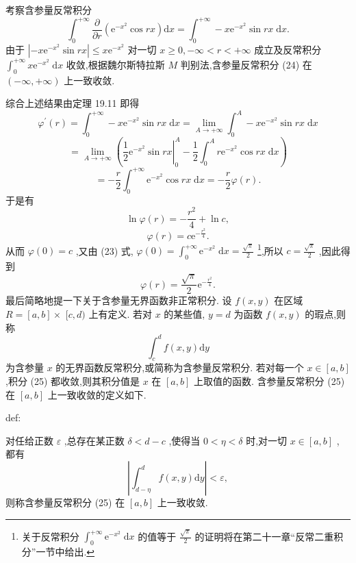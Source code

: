 考察含参量反常积分
\[
{\int }_{0}^{+\infty }\frac{\partial }{\partial r}\left( {{\mathrm{e}}^{-{x}^{2}}\cos {rx}}\right) \mathrm{d}x = {\int }_{0}^{+\infty } - x{\mathrm{e}}^{-{x}^{2}}\sin {rx}\mathrm{\;d}x. \tag{24}
\]
由于 \(\left| {-x{\mathrm{e}}^{-{x}^{2}}\sin {rx}}\right|  \leq  x{\mathrm{e}}^{-{x}^{2}}\) 对一切 \(x \geq  0, - \infty  < r <  + \infty\) 成立及反常积分 \({\int }_{0}^{+\infty }x{\mathrm{e}}^{-{x}^{2}}\mathrm{\;d}x\) 收敛,根据魏尔斯特拉斯 \(M\) 判别法,含参量反常积分 (24) 在 \(\left( {-\infty , + \infty }\right)\) 上一致收敛.

综合上述结果由定理 19.11 即得
\[
{\varphi }^{\prime }\left( r\right)  = {\int }_{0}^{+\infty } - x{\mathrm{e}}^{-{x}^{2}}\sin {rx}\mathrm{\;d}x = \mathop{\lim }\limits_{{A \rightarrow   + \infty }}{\int }_{0}^{A} - x{\mathrm{e}}^{-{x}^{2}}\sin {rx}\mathrm{\;d}x
\]
\[
= \mathop{\lim }\limits_{{A \rightarrow   + \infty }}\left( {{\left. \frac{1}{2}{\mathrm{e}}^{-{x}^{2}}\sin rx\right| }_{0}^{A} - \frac{1}{2}{\int }_{0}^{A}r{\mathrm{e}}^{-{x}^{2}}\cos {rx}\mathrm{\;d}x}\right)
\]
\[
=  - \frac{r}{2}{\int }_{0}^{+\infty }{\mathrm{e}}^{-{x}^{2}}\cos {rx}\mathrm{\;d}x =  - \frac{r}{2}\varphi \left( r\right) .
\]
于是有
\[
\ln \varphi \left( r\right)  =  - \frac{{r}^{2}}{4} + \ln c,
\]
\[
\varphi \left( r\right)  = c{\mathrm{e}}^{-\frac{{r}^{2}}{4}}.
\]
从而 \(\varphi \left( 0\right)  = c\) ,又由 (23) 式, \(\varphi \left( 0\right)  = {\int }_{0}^{+\infty }{\mathrm{e}}^{-{x}^{2}}\mathrm{\;d}x = \frac{\sqrt{\pi }}{2}\) \footnote{关于反常积分 \({\int }_{0}^{+\infty }{\mathrm{e}}^{-{x}^{2}}\mathrm{\;d}x\) 的值等于 \(\frac{\sqrt{\pi }}{2}\) 的证明将在第二十一章“反常二重积分”一节中给出.},所以 \(c = \frac{\sqrt{\pi }}{2}\) ,因此得到
\[
\varphi \left( r\right)  = \frac{\sqrt{\pi }}{2}{\mathrm{e}}^{-\frac{{r}^{2}}{4}}.
\]
最后简略地提一下关于含参量无界函数非正常积分. 设 \(f\left( {x,y}\right)\) 在区域 \(R = \left\lbrack  {a,b}\right\rbrack   \times\)  \(\lbrack c,d)\) 上有定义. 若对 \(x\) 的某些值, \(y = d\) 为函数 \(f\left( {x,y}\right)\) 的瑕点,则称
\[
{\int }_{c}^{d}f\left( {x,y}\right) \mathrm{d}y \tag{25}
\]
为含参量 \(x\) 的无界函数反常积分,或简称为含参量反常积分. 若对每一个 \(x \in  \left\lbrack  {a,b}\right\rbrack\) ,积分 (25) 都收敛,则其积分值是 \(x\) 在 \(\left\lbrack  {a,b}\right\rbrack\) 上取值的函数. 含参量反常积分 (25) 在 \(\left\lbrack  {a,b}\right\rbrack\) 上一致收敛的定义如下.

\begin{definition}{}{def:}

\end{definition}
对任给正数 \(\varepsilon\) ,总存在某正数 \(\delta  < d - c\) ,使得当 \(0 < \eta  < \delta\) 时,对一切 \(x \in  \left\lbrack  {a,b}\right\rbrack\) , 都有
\[
\left| {{\int }_{d - \eta }^{d}f\left( {x,y}\right) \mathrm{d}y}\right|  < \varepsilon ,
\]
则称含参量反常积分 (25) 在 \(\left\lbrack  {a,b}\right\rbrack\) 上一致收敛.

